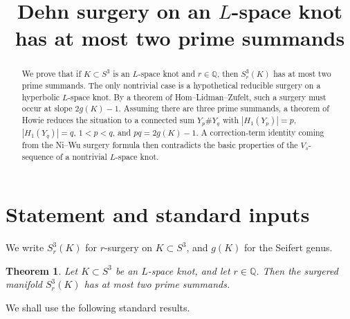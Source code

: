 \documentclass[11pt]{article}
\title{Dehn surgery on an \(L\)-space knot has at most two prime summands}
\author{}
\date{}
\newtheorem{theorem}{Theorem}
\begin{document}
\maketitle

\begin{abstract}
We prove that if \(K\subset S^{3}\) is an \(L\)-space knot and \(r\in \mathbb{Q}\), then
\(S^{3}_{r}(K)\) has at most two prime summands.
The only nontrivial case is a hypothetical reducible surgery on a hyperbolic
\(L\)-space knot.  By a theorem of Hom--Lidman--Zufelt, such a surgery must occur
at slope \(2g(K)-1\).  Assuming there are three prime summands, a theorem of Howie
reduces the situation to a connected sum \(Y_{p}\# Y_{q}\) with
\(|H_{1}(Y_{p})|=p\), \(|H_{1}(Y_{q})|=q\), \(1<p<q\), and \(pq=2g(K)-1\).
A correction-term identity coming from the Ni--Wu surgery formula then contradicts
the basic properties of the \(V_{s}\)-sequence of a nontrivial \(L\)-space knot.
\end{abstract}

\section{Statement and standard inputs}

We write \(S^{3}_{r}(K)\) for \(r\)-surgery on \(K\subset S^{3}\), and
\(g(K)\) for the Seifert genus.

\begin{theorem}\label{thm:main}
Let \(K\subset S^{3}\) be an \(L\)-space knot, and let \(r\in \mathbb{Q}\).
Then the surgered manifold \(S^{3}_{r}(K)\) has at most two prime summands.
\end{theorem}

We shall use the following standard results.
\end{document}
